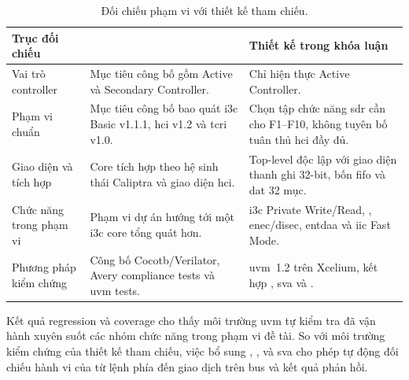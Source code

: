 \begin{table}[!htbp]
	\centering
	\caption{Đối chiếu phạm vi với thiết kế tham chiếu.}
	\label{tab:res-reference-comparison}
	\begin{tabular}{L{3.0cm} L{5.0cm} L{5.0cm}}
		\toprule
		\textbf{Trục đối chiếu} & \textbf{\CHIPSAlliance{} \IThreeCCore{}}                                                                             & \textbf{Thiết kế trong khóa luận} \\
		\midrule
		Vai trò controller
		                        & Mục tiêu công bố gồm Active và Secondary Controller.
		                        & Chỉ hiện thực Active Controller.                                                                                                                         \\
		Phạm vi chuẩn
		                        & Mục tiêu công bố bao quát \gls{i3c} Basic v1.1.1, \gls{hci} v1.2 và \gls{tcri} v1.0.
		                        & Chọn tập chức năng \gls{sdr} cần cho F1--F10, không tuyên bố tuân thủ \gls{hci} đầy đủ.                                                                  \\
		Giao diện và tích hợp
		                        & Core tích hợp theo hệ sinh thái Caliptra và giao diện \gls{hci}.
		                        & Top-level độc lập với giao diện thanh ghi 32-bit, bốn \gls{fifo} và \gls{dat} 32 mục.                                                                    \\
		Chức năng trong phạm vi
		                        & Phạm vi dự án hướng tới một \gls{i3c} core tổng quát hơn.
		                        & \gls{i3c} Private Write/Read, \ImmediateDataTransfer{}, \gls{enec}/\gls{disec}, \gls{entdaa} và \gls{iic} Fast Mode.                                     \\
		Phương pháp kiểm chứng
		                        & Công bố Cocotb/Verilator, Avery compliance tests và \gls{uvm} tests.
		                        & \Gls{uvm}~1.2 trên Xcelium, kết hợp \Scoreboard{}, \gls{sva} và \FunctionalCoverage{}.                                                                   \\
		\bottomrule
	\end{tabular}
\end{table}

Kết quả regression và coverage cho thấy môi trường \gls{uvm} tự kiểm tra đã vận hành xuyên suốt
các nhóm chức năng trong phạm vi đề tài. So với môi trường kiểm chứng của thiết kế tham chiếu,
việc bổ sung \Scoreboard{}, \ReferenceModel{}, \CorrelatedCoverage{} và \gls{sva} cho phép tự động
đối chiếu hành vi của \Controller{} từ lệnh phía \Host{} đến giao dịch trên bus và kết quả phản hồi.

